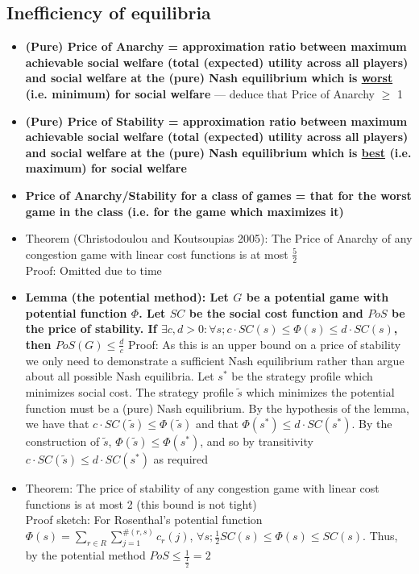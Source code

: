 \documentclass[20pt,a4paper,landscape]{extarticle}
\begin{document}
\begin{flushleft}
\subsection{Inefficiency of equilibria}
\begin{itemize}
\item \textbf{(Pure) Price of Anarchy = approximation ratio between maximum achievable social welfare (total (expected) utility across all players) and social welfare at the (pure) Nash equilibrium which is \underline{worst} (i.e. minimum) for social welfare} --- deduce that Price of Anarchy $\geq$ 1
\item \textbf{(Pure) Price of Stability = approximation ratio between maximum achievable social welfare (total (expected) utility across all players) and social welfare at the (pure) Nash equilibrium which is \underline{best} (i.e. maximum) for social welfare}
\item \textbf{Price of Anarchy/Stability for a class of games = that for the worst game in the class (i.e. for the game which maximizes it)}
\item Theorem (Christodoulou and Koutsoupias 2005): The Price of Anarchy of any
congestion game with linear cost functions is at most $\frac{5}{2}$\\
Proof: Omitted due to time
\item \textbf{Lemma (the potential method): Let $G$ be a potential game with potential function \boldmath$\Phi$. Let $SC$ be the social cost function and $PoS$ be the price of stability. If $\exists c, d > 0: \forall s; c \cdot SC(s) \leq \Phi(s) \leq d \cdot SC(s)$, then $PoS(G) \leq \frac{d}{c}$}
Proof: As this is an upper bound on a price of stability we only need to demonstrate a sufficient Nash equilibrium rather than argue about all possible Nash equilibria. Let $s^\ast$ be the strategy profile which minimizes social cost. The strategy profile $\tilde{s}$ which minimizes the potential function must be a (pure) Nash equilibrium. By the hypothesis of the lemma, we have that $c \cdot SC(\tilde{s}) \leq \Phi(\tilde{s})$ and that $\Phi(s^\ast) \leq d \cdot SC(s^\ast)$. By the construction of $\tilde{s}$, $\Phi(\tilde{s}) \leq \Phi(s^\ast)$, and so by transitivity $c \cdot SC(\tilde{s}) \leq d \cdot SC(s^\ast)$ as required
\item Theorem: The price of stability of any congestion game with linear cost functions is at most 2 (this bound is not tight)\\
Proof sketch: For Rosenthal's potential function $\Phi(s) = \sum_{r \in R}\sum_{j = 1}^{\#(r, s)} c_r(j)$, $\forall s; \frac{1}{2}SC(s) \leq \Phi(s) \leq SC(s)$. Thus, by the potential method $PoS \leq \frac{1}{\frac{1}{2}} = 2$
\end{itemize}
\clearpage

\end{flushleft}
\end{document}
